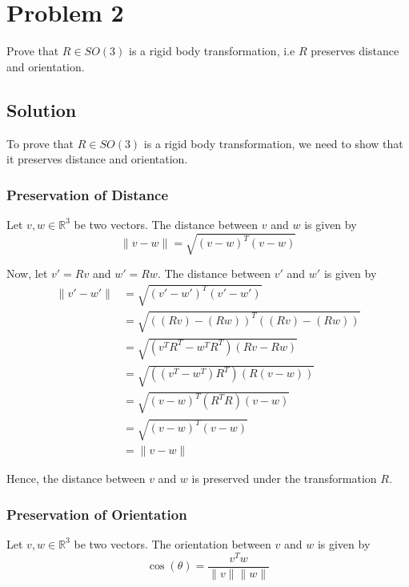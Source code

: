 \section*{Problem 2}

Prove that \(R \in S O(3)\) is a rigid body transformation, i.e \(R\) preserves distance and orientation.

\subsection*{Solution}

To prove that \(R \in S O(3)\) is a rigid body transformation, we need to show that it preserves distance and orientation.

\subsubsection*{Preservation of Distance}

Let \(v, w \in \mathbb{R}^{3}\) be two vectors. The distance between \(v\) and \(w\) is given by
\[
    \lVert v - w \rVert = \sqrt{{(v - w)}^{T}(v - w)}
\]

Now, let \(v' = R v\) and \(w' = R w\). The distance between \(v'\) and \(w'\) is given by
\begin{align*}
    \lVert v' - w' \rVert
     & = \sqrt{{(v' - w')}^{T}(v' - w')}
    \\ & = \sqrt{{((R v) - (R w))}^{T}((R v) - (R w))}
    \\ & = \sqrt{(v^{T} R^{T} - w^{T} R^{T})(R v - R w)}
    \\ & = \sqrt{((v^{T} - w^{T})R^{T}) (R(v - w))}
    \\ & = \sqrt{{(v - w)}^{T} (R^{T} R) (v - w)}
    \\ & = \sqrt{{(v - w)}^{T} (v - w)}
    \\ & = \lVert v - w \rVert
\end{align*}

Hence, the distance between \(v\) and \(w\) is preserved under the transformation \(R\).

\subsubsection*{Preservation of Orientation}

Let \(v, w \in \mathbb{R}^{3}\) be two vectors. The orientation between \(v\) and \(w\) is given by
\[
    \cos(\theta) = \frac{v^{T} w}{\lVert v \rVert \lVert w \rVert}
\]

